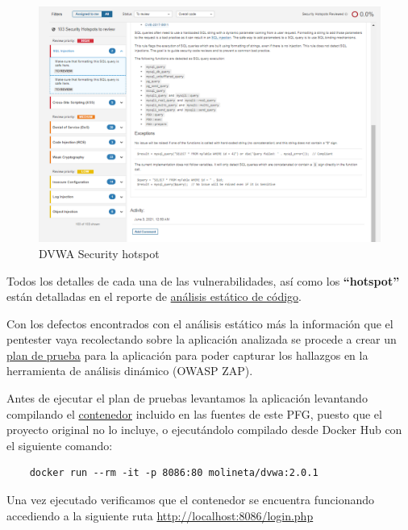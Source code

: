 \begin{figure}[!htb]
    \captionsetup{width=1\linewidth}  
    \includegraphics[width=\linewidth]{./imagenes/04_1_2_01_DVWA_Securityhotspots.png}
    \caption{DVWA Security hotspot}  
    \label{fig:DVWA Security hotspot}
\end{figure}

Todos los detalles de cada una de las vulnerabilidades, así como los \textbf{“hotspot”} están detalladas en el reporte 
de \href{https://github.com/M0l1n3ta/PFG/blob/master/Reportes/An%C3%A1lisis estatico de c%C3%B3digo/ReporteAnalisisestatico_dvwa.docx}{análisis estático de código}.

Con los defectos encontrados con el análisis estático más la información que el pentester vaya recolectando sobre la aplicación
analizada se procede a crear un \href{https://github.com/M0l1n3ta/PFG/blob/master/Scripts/Plan Pruebas/PlanPruebas_DVWA.ps1}{plan de prueba}
para la aplicación para poder capturar los hallazgos en la herramienta de análisis dinámico (OWASP ZAP).

\newpage
Antes de ejecutar el plan de pruebas levantamos la aplicación levantando compilando el \href{https://github.com/M0l1n3ta/PFG/blob/master/EntornoPruebas/dvwa/dockerfile}{contenedor} 
incluido en las fuentes de este PFG, puesto que el proyecto original no lo incluye, o ejecutándolo compilado desde Docker Hub 
con el siguiente comando:

\begin{verbatim}
    docker run --rm -it -p 8086:80 molineta/dvwa:2.0.1
\end{verbatim}

Una vez ejecutado verificamos que el contenedor se encuentra funcionando accediendo a la siguiente 
ruta \url{http://localhost:8086/login.php}\\

